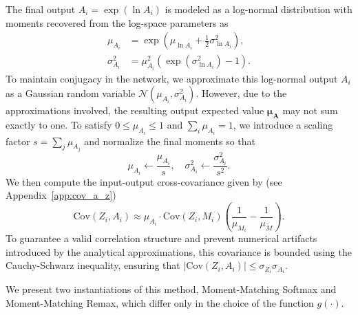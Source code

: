 \documentclass{uai2026} %
\begin{document}
The final output $A_i = \exp(\ln A_i)$ is modeled as a log-normal distribution with moments recovered from the log-space parameters as
\begin{align*}
\mu_{{A}_i} &= \exp\left(\mu_{\ln{A}_i}+\frac{1}{2}\sigma_{\ln{A}_i}^2\right),\\
\sigma_{{A}_i}^2 &= \mu_{{A}_i}^2 \left(\exp(\sigma_{\ln{A}_i}^2)-1\right).
\end{align*}
To maintain conjugacy in the network, we approximate this log-normal output $A_i$ as a Gaussian random variable $\mathcal{N}(\mu_{{A}_i},\sigma_{{A}_i}^2)$. However, due to the approximations involved, the resulting output expected value $\bm{\mu}_{\bm{A}}$ may not sum exactly to one. To satisfy $0 \le \mu_{A_i} \le 1$ and $\sum_i \mu_{A_i} = 1$, we introduce a scaling factor $s = \sum_j \mu_{A_j}$ and normalize the final moments so that
\begin{equation*}
\mu_{A_i} \leftarrow \frac{\mu_{A_i}}{s}, \quad \sigma_{A_i}^2 \leftarrow \frac{\sigma_{A_i}^2}{s^2}.
\end{equation*}
We then compute the input-output cross-covariance given by (see Appendix~\ref{app:cov_a_z})
\begin{equation*}
\text{Cov}(Z_i, A_i) \approx \mu_{A_i} \cdot \text{Cov}(Z_i, M_i) \left( \frac{1}{\mu_{M_i}} - \frac{1}{\mu_{\tilde{M}}} \right).
\end{equation*}
To guarantee a valid correlation structure and prevent numerical artifacts introduced by the analytical approximations, this covariance is bounded using the Cauchy-Schwarz inequality, ensuring that $|\text{Cov}(Z_i, A_i)| \le \sigma_{Z_i} \sigma_{A_i}$.

We present two instantiations of this method, Moment-Matching Softmax and Moment-Matching Remax, which differ only in the choice of the function $g(\cdot)$.
\end{document}
